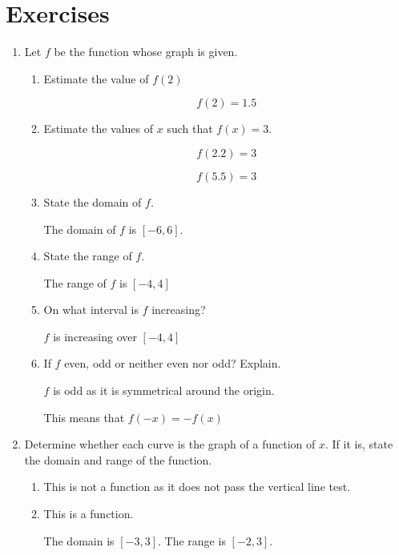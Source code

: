 \documentclass{article}
\begin{document}
\section{Exercises}

\begin{enumerate}

\item Let $f$ be the function whose graph is given.

	\begin{enumerate}
		\item Estimate the value of $f(2)$

			$$f(2) = 1.5$$

		\item Estimate the values of $x$ such that $f(x) = 3$.

			$$f(2.2) = 3$$

			$$f(5.5) = 3$$

		\item State the domain of $f$.

			The domain of $f$ is $[-6, 6]$.

		\item State the range of $f$.

			The range of $f$ is $[-4, 4]$

		\item On what interval is $f$ increasing?

			$f$ is increasing over $[-4, 4]$

		\item If $f$ even, odd or neither even nor odd? Explain.

			$f$ is odd as it is symmetrical around the origin.

			This means that $f(-x) = -f(x)$
	\end{enumerate}

	\item Determine whether each curve is the graph of a function of $x$.
		If it is, state the domain and range of the function.

	\begin{enumerate}
		\item

		This is not a function as it does not pass the vertical line test.

		\item

		This is a function.

		The domain is $[-3, 3]$. The range is $[-2, 3]$.
	\end{enumerate}


\end{enumerate}
\end{document}
